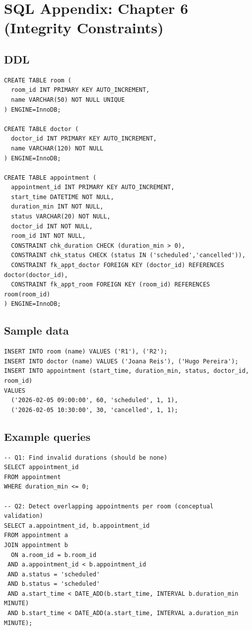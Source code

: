 \chapter{SQL Appendix: Chapter 6 (Integrity Constraints)}

\section{DDL}
\begin{verbatim}
CREATE TABLE room (
  room_id INT PRIMARY KEY AUTO_INCREMENT,
  name VARCHAR(50) NOT NULL UNIQUE
) ENGINE=InnoDB;

CREATE TABLE doctor (
  doctor_id INT PRIMARY KEY AUTO_INCREMENT,
  name VARCHAR(120) NOT NULL
) ENGINE=InnoDB;

CREATE TABLE appointment (
  appointment_id INT PRIMARY KEY AUTO_INCREMENT,
  start_time DATETIME NOT NULL,
  duration_min INT NOT NULL,
  status VARCHAR(20) NOT NULL,
  doctor_id INT NOT NULL,
  room_id INT NOT NULL,
  CONSTRAINT chk_duration CHECK (duration_min > 0),
  CONSTRAINT chk_status CHECK (status IN ('scheduled','cancelled')),
  CONSTRAINT fk_appt_doctor FOREIGN KEY (doctor_id) REFERENCES doctor(doctor_id),
  CONSTRAINT fk_appt_room FOREIGN KEY (room_id) REFERENCES room(room_id)
) ENGINE=InnoDB;
\end{verbatim}

\section{Sample data}
\begin{verbatim}
INSERT INTO room (name) VALUES ('R1'), ('R2');
INSERT INTO doctor (name) VALUES ('Joana Reis'), ('Hugo Pereira');
INSERT INTO appointment (start_time, duration_min, status, doctor_id, room_id)
VALUES
  ('2026-02-05 09:00:00', 60, 'scheduled', 1, 1),
  ('2026-02-05 10:30:00', 30, 'cancelled', 1, 1);
\end{verbatim}

\section{Example queries}
\begin{verbatim}
-- Q1: Find invalid durations (should be none)
SELECT appointment_id
FROM appointment
WHERE duration_min <= 0;

-- Q2: Detect overlapping appointments per room (conceptual validation)
SELECT a.appointment_id, b.appointment_id
FROM appointment a
JOIN appointment b
  ON a.room_id = b.room_id
 AND a.appointment_id < b.appointment_id
 AND a.status = 'scheduled'
 AND b.status = 'scheduled'
 AND a.start_time < DATE_ADD(b.start_time, INTERVAL b.duration_min MINUTE)
 AND b.start_time < DATE_ADD(a.start_time, INTERVAL a.duration_min MINUTE);
\end{verbatim}
